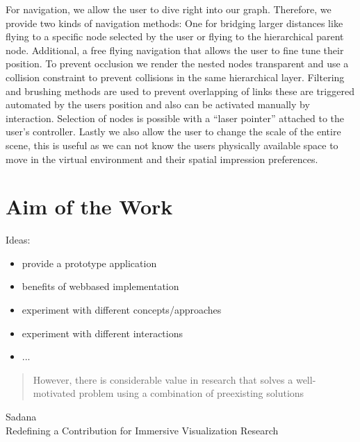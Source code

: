 For navigation, we allow the user to dive right into our graph. Therefore, we provide two kinds of navigation methods: One for bridging larger distances like flying to a specific node selected by the user or flying to the hierarchical parent node. Additional, a free flying navigation that allows the user to fine tune their position. To prevent occlusion we render the nested nodes transparent and use a collision constraint to prevent collisions in the same hierarchical layer. Filtering and brushing methods are used to prevent overlapping of links these are triggered automated by the users position and also can be activated manually by interaction. Selection of nodes is possible with a “laser pointer” attached to the user's controller. Lastly we also allow the user to change the scale of the entire scene, this is useful as we can not know the users physically available space to move in the virtual environment and their spatial impression preferences. 


\section{Aim of the Work}

Ideas:
\begin{itemize}
    \item provide a prototype application
    \item benefits of webbased implementation 
    \item experiment with different concepts/approaches
    \item experiment with different interactions
    \item ...
\end{itemize}

\begin{quotation}
    However, there is considerable value in research that
    solves a well-motivated problem using a combination
    of preexisting solutions 
\end{quotation}
Sadana\\
Redefining a Contribution for Immersive Visualization Research\\
